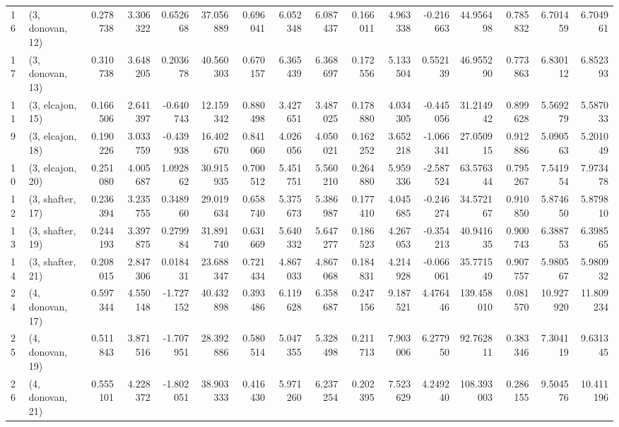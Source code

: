 \begin{tabular}{llrrrrrrrrrrrrrr}
16 &  (3, donovan, 12) &   0.278738 &  3.306322 &  0.652668 &  37.056889 &  0.696041 &   6.052348 &  6.087437 &  0.166011 &  4.963338 & -0.216663 &   44.956498 &  0.785832 &   6.701459 &   6.704961 \\
17 &  (3, donovan, 13) &   0.310738 &  3.648205 &  0.203678 &  40.560303 &  0.670157 &   6.365439 &  6.368697 &  0.172556 &  5.133504 &  0.552139 &   46.955290 &  0.773863 &   6.830112 &   6.852393 \\
11 &  (3, elcajon, 15) &   0.166506 &  2.641397 & -0.640743 &  12.159342 &  0.880498 &   3.427651 &  3.487025 &  0.178880 &  4.034305 & -0.445056 &   31.214942 &  0.899628 &   5.569279 &   5.587033 \\
9  &  (3, elcajon, 18) &   0.190226 &  3.033759 & -0.439938 &  16.402670 &  0.841060 &   4.026056 &  4.050021 &  0.162252 &  3.652218 & -1.066341 &   27.050915 &  0.912886 &   5.090563 &   5.201049 \\
10 &  (3, elcajon, 20) &   0.251080 &  4.005687 &  1.092862 &  30.915935 &  0.700512 &   5.451751 &  5.560210 &  0.264880 &  5.959336 & -2.587524 &   63.576344 &  0.795267 &   7.541954 &   7.973478 \\
12 &  (3, shafter, 17) &   0.236394 &  3.235755 &  0.348960 &  29.019634 &  0.658740 &   5.375673 &  5.386987 &  0.177410 &  4.045685 & -0.246274 &   34.572167 &  0.910850 &   5.874650 &   5.879810 \\
13 &  (3, shafter, 19) &   0.244193 &  3.397875 &  0.279984 &  31.891740 &  0.631669 &   5.640332 &  5.647277 &  0.186523 &  4.267053 & -0.354213 &   40.941635 &  0.900743 &   6.388753 &   6.398565 \\
14 &  (3, shafter, 21) &   0.208015 &  2.847306 &  0.018431 &  23.688347 &  0.721434 &   4.867033 &  4.867068 &  0.184831 &  4.214928 & -0.066061 &   35.771549 &  0.907757 &   5.980567 &   5.980932 \\
24 &  (4, donovan, 17) &   0.597344 &  4.550148 & -1.727152 &  40.432898 &  0.393486 &   6.119628 &  6.358687 &  0.247156 &  9.187521 &  4.476446 &  139.458010 &  0.081570 &  10.927920 &  11.809234 \\
25 &  (4, donovan, 19) &   0.511843 &  3.871516 & -1.707951 &  28.392886 &  0.580514 &   5.047355 &  5.328498 &  0.211713 &  7.903006 &  6.277950 &   92.762811 &  0.383346 &   7.304119 &   9.631345 \\
26 &  (4, donovan, 21) &   0.555101 &  4.228372 & -1.802051 &  38.903333 &  0.416430 &   5.971260 &  6.237254 &  0.202395 &  7.523629 &  4.249240 &  108.393003 &  0.286155 &   9.504576 &  10.411196 \\

\end{tabular}
